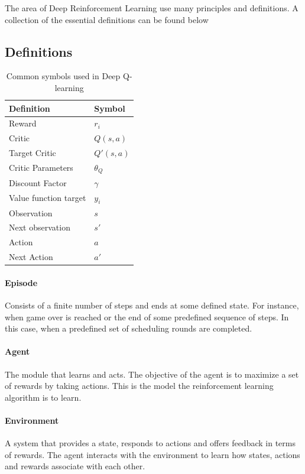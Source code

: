 The area of Deep Reinforcement Learning use many principles and definitions. A collection of the essential definitions can be found below


\subsection{Definitions}
\begin{table}[h!]
    \centering
    \footnotesize{
    \begin{tabular}{l|l}
        Definition & Symbol  \\ \hline
        Reward & $r_i$ \\
        Critic & $Q(s, a)$ \\
        Target Critic & $Q'(s, a)$\\
        Critic Parameters & $\theta_Q$ \\
        Discount Factor & $\gamma$ \\
        Value function target & $y_i$ \\
        Observation & $s$ \\
        Next observation & $s'$ \\
        Action & $a$ \\
        Next Action & $a'$ \\
    \end{tabular}
    \caption{Common symbols used in Deep Q-learning}
    \label{tab:deep_q_learning_symbols}
    }
\end{table}

\paragraph{Episode}
Consists of a finite number of steps and ends at some defined state. For instance, when game over is reached or the end of some predefined sequence of steps. In this case, when a predefined set of scheduling rounds are completed.

\paragraph{Agent}
The module that learns and acts. The objective of the agent is to maximize a set of rewards by taking actions. This is the model the reinforcement learning algorithm is to learn.

\paragraph{Environment}
A system that provides a state, responds to actions and offers feedback in terms of rewards. The agent interacts with the environment to learn how states, actions and rewards associate with each other.


